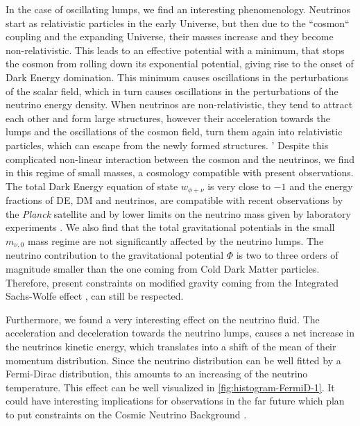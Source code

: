 In the case of oscillating lumps, we find an interesting phenomenology. Neutrinos start as relativistic particles in the early Universe,
but then due to the ``cosmon`` coupling and the expanding Universe, their masses increase and they become non-relativistic.
This leads to an effective potential with a minimum, that stops the cosmon from rolling down its exponential potential,
giving rise to the onset of Dark Energy domination. This minimum causes oscillations in the perturbations of the scalar field,
which in turn causes oscillations in the perturbations of the neutrino energy density.
When neutrinos are non-relativistic, they tend to attract each other and form large  structures, however their acceleration towards the lumps
and the oscillations of the cosmon field, turn them again into relativistic particles, which can escape from the newly formed structures.
'
Despite this complicated non-linear interaction between the cosmon and the neutrinos, we find in this regime of small masses,
a cosmology compatible with present observations. The total Dark Energy equation of state $w_{\phi+\nu}$ is very close to $-1$
and the energy fractions of DE, DM and neutrinos, are compatible with recent observations by the \textit{Planck} satellite \cite{Planck:2015xua}
and by lower limits on the neutrino mass given by laboratory experiments . We also find that
the total gravitational potentials in the small $m_{\nu,0}$ mass regime are not significantly affected by the neutrino lumps.
The neutrino contribution to the gravitational potential $\Phi$ is two to three orders of magnitude smaller than the one coming from
Cold Dark Matter particles. Therefore, present constraints on modified gravity coming from the Integrated Sachs-Wolfe effect , 
can still be respected.

Furthermore, we found a very interesting effect on the neutrino fluid. The acceleration and deceleration towards the neutrino lumps,
causes a net increase in the neutrinos kinetic energy, which translates into a shift of the mean of their momentum distribution. 
Since the neutrino distribution can be well fitted by a Fermi-Dirac distribution, this amounts to an increasing of the neutrino temperature.
This effect can be well visualized in \cref{fig:histogram-FermiD-1}. It could have interesting implications for observations in the
far future which plan to put constraints on the Cosmic Neutrino Background .

